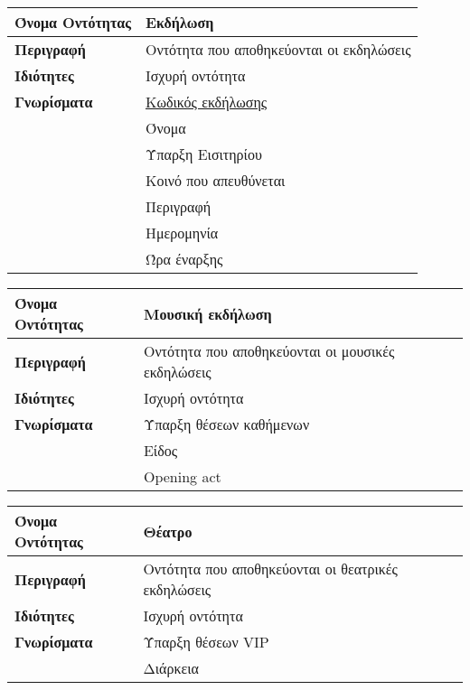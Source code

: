 \begin{center}
\begin{tabular}[]{|p{4cm}|p{10cm}|}
\hline
\textbf{Όνομα Οντότητας}   &  Εκδήλωση  \\ \hline 
\textbf{Περιγραφή}         &  Οντότητα που αποθηκεύονται οι εκδηλώσεις \\ \hline 
\textbf{Ιδιότητες}         &  Ισχυρή οντότητα \\  \hline               
\textbf{Γνωρίσματα}        &  \underline{Κωδικός εκδήλωσης} \\
                           &  Όνομα \\
            ~              &  Ύπαρξη Εισιτηρίου \\
             ~             &  Κοινό που απευθύνεται \\
              ~            &  Περιγραφή \\
                           &  Ημερομηνία \\
                           &  Ώρα έναρξης\\
 \hline
\end{tabular}
\vspace{0.3 cm}


\begin{tabular}[]{|p{4cm}|p{10cm}|}
 \hline
\textbf{Όνομα Οντότητας}   &  Μουσική εκδήλωση  \\ \hline 
\textbf{Περιγραφή}         &  Οντότητα που αποθηκεύονται οι μουσικές εκδηλώσεις \\ \hline 
\textbf{Ιδιότητες}         &  Ισχυρή οντότητα \\  \hline               
\textbf{Γνωρίσματα}        &  Ύπαρξη θέσεων καθήμενων \\
                           &  Είδος \\
                           &  Opening act \\
 \hline
\end{tabular}
\vspace{0.3 cm}

\begin{tabular}[]{|p{4cm}|p{10cm}|}
\hline
\textbf{Όνομα Οντότητας}   &  Θέατρο \\ \hline 
\textbf{Περιγραφή}         &  Οντότητα που αποθηκεύονται οι θεατρικές εκδηλώσεις \\ \hline 
\textbf{Ιδιότητες}         &  Ισχυρή οντότητα \\  \hline               
\textbf{Γνωρίσματα}        &  Ύπαρξη θέσεων VIP \\
                           &  Διάρκεια \\
\hline
\end{tabular}
\vspace{0.3 cm}


\end{center}
